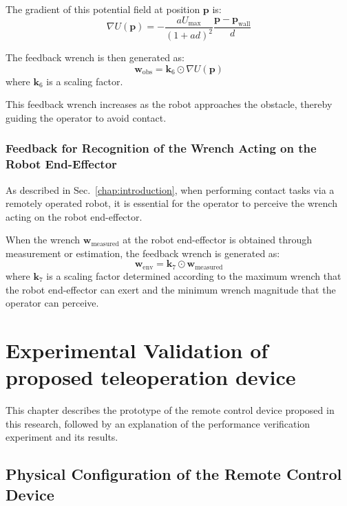 \documentclass{WileyMSP-template}
\begin{document}
The gradient of this potential field at position $\bm{p}$ is:
\begin{equation}
  \nabla U(\bm{p}) = -\frac{a U_{\max}}{(1 + a d)^2} \frac{\bm{p} - \bm{p}_{\text{wall}}}{d}
\end{equation}

The feedback wrench is then generated as:
\begin{equation}
  \bm{w}_{\text{obs}} = \bm{k}_6 \odot \nabla U(\bm{p})
\end{equation}
where $\bm{k}_6$ is a scaling factor.

This feedback wrench increases as the robot approaches the obstacle, thereby guiding the operator to avoid contact.

\subsubsection{Feedback for Recognition of the Wrench Acting on the Robot End-Effector}\label{subsec:feedback_from_robot}

As described in Sec.~\ref{chap:introduction}, when performing contact tasks via a remotely operated robot, it is essential for the operator to perceive the wrench acting on the robot end-effector.

When the wrench $\bm{w}_{\text{measured}}$ at the robot end-effector is obtained through measurement or estimation, the feedback wrench is generated as:
\begin{equation}
  \bm{w}_{\text{env}} = \bm{k}_7 \odot \bm{w}_{\text{measured}}
\end{equation}
where $\bm{k}_7$ is a scaling factor determined according to the maximum wrench that the robot end-effector can exert and the minimum wrench magnitude that the operator can perceive.

\section{Experimental Validation of proposed teleoperation device}
This chapter describes the prototype of the remote control device proposed in this research, followed by an explanation of the performance verification experiment and its results.

\subsection{Physical Configuration of the Remote Control Device}
\end{document}
